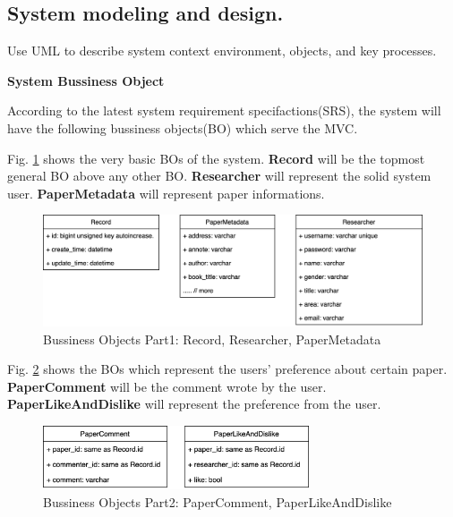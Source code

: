 \subsection{System modeling and design.}
Use UML to describe system context environment, objects, and key processes.

\textbf{System Bussiness Object}

According to the latest system requirement specifactions(SRS), 
the system will have the following bussiness objects(BO) which serve the MVC.

Fig. \ref{fig:bo_classes_1} shows the very basic BOs of the system. 
\textbf{Record} will be the topmost general BO above any other BO.
\textbf{Researcher} will represent the solid system user.
\textbf{PaperMetadata} will represent paper informations.

\begin{figure}[t]
	\centering
	\includegraphics[width=\textwidth]{./img/bo_classes_1.png}
	\caption{Bussiness Objects Part1: Record, Researcher, PaperMetadata}
	
	\label{fig:bo_classes_1}
\end{figure}


Fig. \ref{fig:bo_classes_2} shows the BOs which represent the users' preference about certain paper. 
\textbf{PaperComment} will be the comment wrote by the user.
\textbf{PaperLikeAndDislike} will represent the preference from the user.

\begin{figure}[t]
	\centering
	\includegraphics[width=0.7\textwidth]{./img/bo_classes_2.png}
	\caption{Bussiness Objects Part2: PaperComment, PaperLikeAndDislike}
	
	\label{fig:bo_classes_2}
\end{figure}

